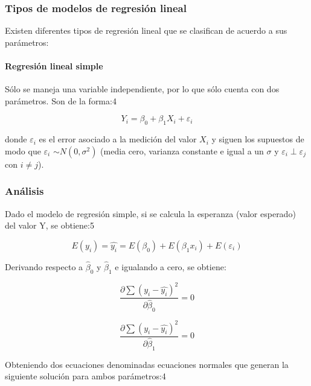 \documentclass{article}
\begin{document}
\subsubsection{Tipos de modelos de regresión
lineal}\label{tipos-de-modelos-de-regresiuxf3n-lineal}

Existen diferentes tipos de regresión lineal que se clasifican de
acuerdo a sus parámetros:

\paragraph{Regresión lineal simple}\label{regresiuxf3n-lineal-simple}

Sólo se maneja una variable independiente, por lo que sólo cuenta con
dos parámetros. Son de la forma:4

\begin{equation}
Y_i = \beta_0 + \beta_1 X_i + \varepsilon_i
\end{equation}

donde $\varepsilon_i$ es el error asociado a la medición del valor $X_i$
y siguen los supuestos de modo que $\varepsilon_i$ $\sim N(0,\sigma^2)$
(media cero, varianza constante e igual a un $\sigma$ y
$\varepsilon_i \perp \varepsilon_j$ con $i\neq j$).

\subsubsection{Análisis}\label{anuxe1lisis}

Dado el modelo de regresión simple, si se calcula la esperanza (valor
esperado) del valor Y, se obtiene:5

\begin{equation}
E(y_i) = \hat{y_i}=E(\beta_0) + E(\beta_1 x_i) + E(\varepsilon_i)
\end{equation}

Derivando respecto a $\hat{\beta}_0$ y $\hat{\beta}_1$ e igualando a
cero, se obtiene:

\begin{equation}
\frac{\partial \sum (y_i - \hat{y_i})^2 }{\partial \hat{\beta}_0} = 0 
\end{equation}

\begin{equation}
\frac{\partial \sum (y_i - \hat{y_i})^2 }{\partial \hat{\beta}_1} = 0 
\end{equation}

Obteniendo dos ecuaciones denominadas ecuaciones normales que generan la
siguiente solución para ambos parámetros:4
\end{document}
